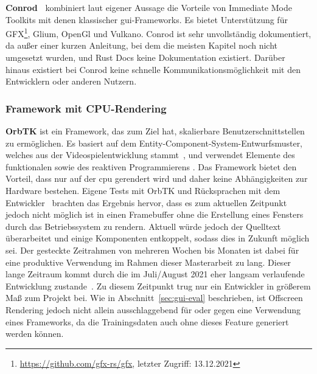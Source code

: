 \textbf{Conrod~\cite{PistonDevelopersConrod2014}} kombiniert laut eigener Aussage die Vorteile von Immediate Mode Toolkits mit denen klassischer \gls{gui}-Frameworks. Es bietet Unterstützung für GFX\footnote{\url{https://github.com/gfx-rs/gfx}, letzter Zugriff: 13.12.2021}, Glium, OpenGl und Vulkano. Conrod ist sehr unvollständig dokumentiert, da außer einer kurzen Anleitung, bei dem die meisten Kapitel noch nicht umgesetzt wurden, und Rust Docs keine Dokumentation existiert. Darüber hinaus existiert bei Conrod keine schnelle Kommunikationsmöglichkeit mit den Entwicklern oder anderen Nutzern.


\subsubsection*{Framework mit CPU-Rendering}
\textbf{OrbTK} ist ein Framework, das zum Ziel hat, skalierbare Benutzerschnittstellen zu ermöglichen. Es basiert auf dem Entity-Component-System-Entwurfsmuster, welches aus der Videospielentwicklung stammt~\cite{muratetAccessibilitySeriousGames2020}, und verwendet Elemente des funktionalen sowie des reaktiven Programmierens \cite{RedoxosOrbtk2015}. Das Framework bietet den Vorteil, dass nur auf der \gls{cpu} gerendert wird und daher keine Abhängigkeiten zur Hardware bestehen. Eigene Tests mit OrbTK und Rücksprachen mit dem Entwickler~\cite{blasiusMomentItIt,blasiusHiDifficultSay} brachten das Ergebnis hervor, dass es zum aktuellen Zeitpunkt jedoch nicht möglich ist in einen Framebuffer ohne die Erstellung eines Fensters durch das Betriebssystem zu rendern. Aktuell würde jedoch der Quelltext überarbeitet und einige Komponenten entkoppelt, sodass dies in Zukunft möglich sei. Der gesteckte Zeitrahmen von mehreren Wochen bis Monaten ist dabei für eine produktive Verwendung im Rahmen dieser Masterarbeit zu lang. Dieser lange Zeitraum kommt durch die im Juli/August 2021 eher langsam verlaufende Entwicklung zustande~\cite{blasiusHiDifficultSay}. Zu diesem Zeitpunkt trug nur ein Entwickler in größerem Maß zum Projekt bei. Wie in Abschnitt~\ref{sec:gui-eval} beschrieben, ist Offscreen Rendering jedoch nicht allein ausschlaggebend für oder gegen eine Verwendung eines Frameworks, da die Trainingsdaten auch ohne dieses Feature generiert werden können.

